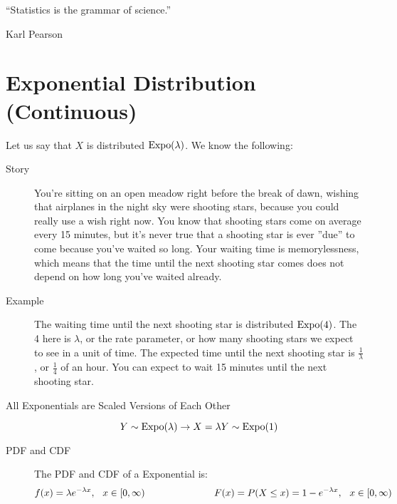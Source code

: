 \documentclass[11pt]{article}
\begin{document}

\setlength{\epigraphwidth}{.6\textwidth}
\epigraph{“Statistics is the grammar of science.”}{Karl Pearson}

\section*{Exponential Distribution (Continuous)}
\begin{description}
\item Let us say that $X$ is distributed $\textrm{Expo}(\lambda)$. We know the following:
\begin{description}
  \item[Story] You're sitting on an open meadow right before the break of dawn, wishing that airplanes in the night sky were shooting stars, because you could really use a wish right now. You know that shooting stars come on average every 15 minutes, but it's never true that a shooting star is ever ''due'' to come because you've waited so long. Your waiting time is memorylessness, which means that the time until the next shooting star comes does not depend on how long you've waited already.

  \item[Example] The waiting time until the next shooting star is distributed $\textrm{Expo}(4)$. The 4 here is $\lambda$, or the rate parameter, or how many shooting stars we expect to see in a unit of time. The expected time until the next shooting star is $\frac{1}{\lambda}$, or $\frac{1}{4}$ of an hour. You can expect to wait 15 minutes until the next shooting star.

  \item[All Exponentials are Scaled Versions of Each Other]
    \[Y \sim \textrm{Expo}(\lambda) \rightarrow X = \lambda Y \sim \textrm{Expo}(1)\]

  \item[PDF and CDF] The PDF and CDF of a Exponential is:
\begin{eqnarray*}
f(x) = \lambda e^{-\lambda x},
\hspace{.1 in}
x \in [0, \infty)
\hspace{1 in}
F(x) = P(X \leq x) = 1 - e^{-\lambda x},
\hspace{.1 in}
x \in [0, \infty)
\end{eqnarray*}



\end{description}
\end{description}
\end{document}
